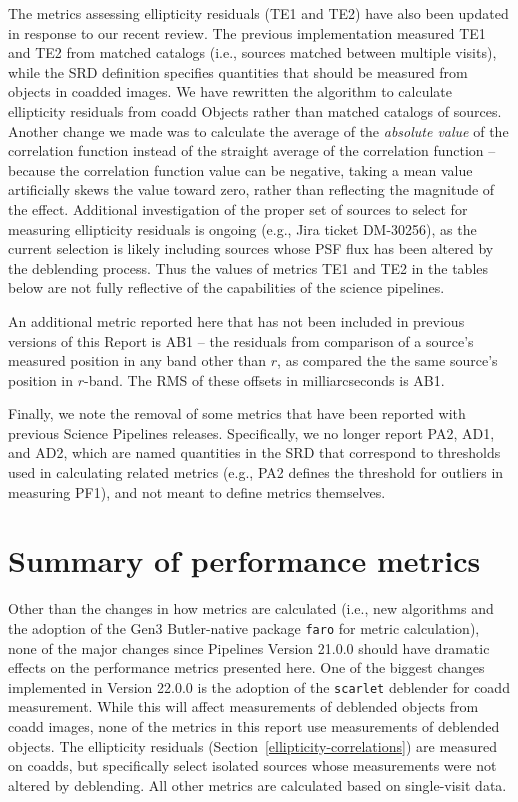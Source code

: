 \documentclass[DM, lsstdraft, toc]{lsstdoc}
\begin{document}
The metrics assessing ellipticity residuals (TE1 and TE2) have also been updated in response to our recent review. The previous implementation measured TE1 and TE2 from matched catalogs (i.e., sources matched between multiple visits), while the SRD definition specifies quantities that should be measured from objects in coadded images. We have rewritten the algorithm to calculate ellipticity residuals from coadd Objects rather than matched catalogs of sources. Another change we made was to calculate the average of the \textit{absolute value} of the correlation function instead of the straight average of the correlation function -- because the correlation function value can be negative, taking a mean value artificially skews the value toward zero, rather than reflecting the magnitude of the effect. Additional investigation of the proper set of sources to select for measuring ellipticity residuals is ongoing (e.g., Jira ticket DM-30256), as the current selection is likely including sources whose PSF flux has been altered by the deblending process. Thus the values of metrics TE1 and TE2 in the tables below are not fully reflective of the capabilities of the science pipelines.

An additional metric reported here that has not been included in previous versions of this Report is AB1 -- the residuals from comparison of a source's measured position in any band other than $r$, as compared the the same source's position in $r$-band. The RMS of these offsets in milliarcseconds is AB1.

Finally, we note the removal of some metrics that have been reported with previous Science Pipelines releases. Specifically, we no longer report PA2, AD1, and AD2, which are named quantities in the SRD that correspond to thresholds used in calculating related metrics (e.g., PA2 defines the threshold for outliers in measuring PF1), and not meant to define metrics themselves.

\section{Summary of performance metrics}

Other than the changes in how metrics are calculated (i.e., new algorithms and the adoption of the Gen3 Butler-native package \texttt{faro} for metric calculation), none of the major changes since Pipelines Version 21.0.0 should have dramatic effects on the performance metrics presented here. One of the biggest changes implemented in Version 22.0.0 is the adoption of the \texttt{scarlet} deblender for coadd measurement. While this will affect measurements of deblended objects from coadd images, none of the metrics in this report use measurements of deblended objects. The ellipticity residuals (Section~\ref{ellipticity-correlations}) are measured on coadds, but specifically select isolated sources whose measurements were not altered by deblending. All other metrics are calculated based on single-visit data.
\end{document}
